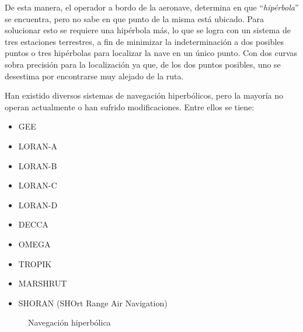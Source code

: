 De esta manera, el operador a bordo de la aeronave, determina en que ``\emph{hip\'erbola}'' se encuentra, pero no sabe en que punto de la misma est\'a ubicado. 
Para solucionar esto se requiere una hip\'erbola m\'as, lo que se logra
con un sistema de tres estaciones terrestres, 
a fin de minimizar la indeterminaci\'on a dos posibles puntos 
o tres hip\'erbolas para localizar la nave en un \'unico punto. 
Con dos curvas sobra precisi\'on para la localizaci\'on ya que, 
de los dos puntos posibles, uno se desestima por encontrarse muy alejado de la ruta.

Han existido diversos sistemas de navegaci\'on hiperb\'olicos, pero la mayor\'ia no operan actualmente o han sufrido modificaciones. Entre ellos se tiene:
\begin{multicols}{2}
\begin{itemize}
\item GEE

\item LORAN-A
\item  LORAN-B
\item LORAN-C
\item LORAN-D

\item DECCA

\item OMEGA

\item TROPIK

\item MARSHRUT

\item SHORAN (SHOrt Range Air Navigation)
\end{itemize}
\end{multicols}

\begin{figure}[!h]
  \centering
\hspace{1em}
 \caption{Navegaci\'on hiperb\'olica}

\end{figure}


